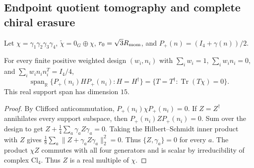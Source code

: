 \documentclass[12pt,a4paper]{article}
\begin{document}
\subsection{Endpoint quotient tomography and complete chiral erasure}
\label{p2c:sec:v354-endpoint-quotient}
Let $\chi=\gamma_1\gamma_2\gamma_3\gamma_4$, $\widetilde\chi=0_G\oplus\chi$,
$r_0=\sqrt3R_{\rm mom}$, and $P_+(n)=(I_4+\gamma(n))/2$.

\begin{theorem}
\label{p2c:thm:v354-unique-protected-obstruction}
For every finite positive weighted design $(w_i,n_i)$ with
$\sum_iw_i=1$, $\sum_iw_in_i=0$, and
$\sum_iw_in_in_i^T=I_4/4$,
\[
\operatorname{span}_{\mathbb R}\{P_+(n_i)HP_+(n_i):H=H^\dagger\}
=\{T=T^\dagger:\operatorname{Tr}(T\chi)=0\}.
\]
This real support span has dimension $15$.
\end{theorem}
\begin{proof}
By Clifford anticommutation, $P_+(n_i)\chi P_+(n_i)=0$.
If $Z=Z^\dagger$ annihilates every support subspace, then
$P_+(n_i)ZP_+(n_i)=0$. Sum over the design to get
$Z+\frac14\sum_a\gamma_aZ\gamma_a=0$.
Taking the Hilbert--Schmidt inner product with $Z$ gives
$\frac18\sum_a\|Z+\gamma_aZ\gamma_a\|_2^2=0$.
Thus $\{Z,\gamma_a\}=0$ for every $a$. The product $\chi Z$
commutes with all four generators and is scalar by irreducibility
of complex $\mathrm{Cl}_4$. Thus $Z$ is a real multiple of $\chi$.
\end{proof}
\end{document}
